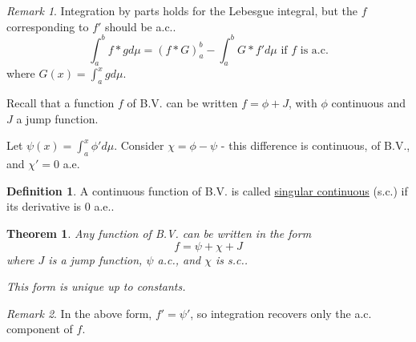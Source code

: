 \documentclass[11pt,a4paper]{report}
\theoremstyle{plain}
\newtheorem{thm}{Theorem}[section]
\theoremstyle{definition}
\newtheorem*{defn}{Definition}
\theoremstyle{remark}
\newtheorem*{rem}{Remark}
\begin{document}
\begin{rem}
  Integration by parts holds for the Lebesgue integral, but the $f$ corresponding to $f'$ should be a.c..
 $$ \int_a^b f * g d\mu = (f * G)_a^b - \int_a^b G * f' d\mu \text{ if $f$ is a.c.} $$
  where $G(x) = \int_a^x g d\mu$.
\end{rem}

Recall that a function $f$ of B.V. can be written $f = \phi + J$, with $\phi$ continuous and $J$ a jump function.

Let $\psi(x) = \int_a^x \phi' d\mu$. Consider $\chi = \phi - \psi$ - this difference is continuous, of B.V., and $\chi' = 0$ a.e.

\begin{defn}
    A continuous function of B.V. is called \underline{singular continuous} (s.c.) if its derivative is $0$ a.e..
\end{defn}

\begin{thm}
  Any function of B.V. can be written in the form
  $$ f = \psi + \chi + J $$ where $J$ is a jump function, $\psi$ a.c., and $\chi$ is s.c..

  This form is unique up to constants.
\end{thm}

\begin{rem}
  In the above form, $f' = \psi'$, so integration recovers only the a.c. component of $f$.
\end{rem}
\end{document}
